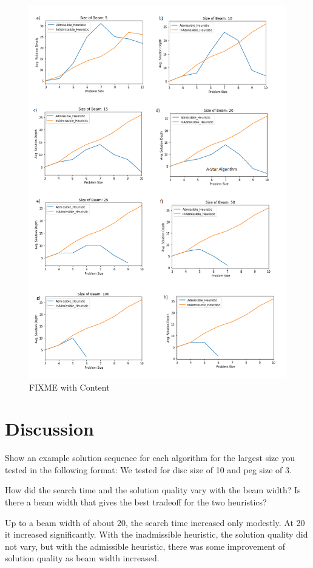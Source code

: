 \documentclass{article}
\newenvironment{Question}[2][Question]{\begin{trivlist}
\item[\hskip \labelsep {\bfseries #1}\hskip \labelsep {\bfseries #2.}]}{\end{trivlist}}
\begin{document}
\begin{figure}[h!]
\centering
\includegraphics[width=0.7\linewidth]{all_solution_depth.png}
\caption{FIXME with Content}
\label{fig:reflex}
\end{figure}

\section{Discussion}


\begin{Question}{1}Show an example solution sequence for each algorithm for the largest size you tested in the following format:
We tested for disc size of 10 and peg size of 3. 


\end{Question}



\begin{Question}{2}How did the search time and the solution quality vary with the beam width? Is there a beam width that gives the best tradeoff for the two heuristics?

Up to a beam width of about 20, the search time increased only modestly. At 20 it increased significantly. With the inadmissible heuristic, the solution quality did not vary, but with the admissible heuristic, there was some improvement of solution quality as beam width increased.

\end{Question}
\end{document}
